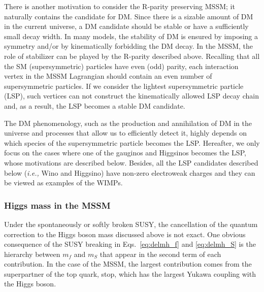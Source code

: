 \documentclass[12pt,twoside,book]{article}
\begin{document}
There is another motivation to consider the R-parity preserving MSSM; it naturally contains the candidate for DM.
Since there is a sizable amount of DM in the current universe, a DM candidate should be stable or have a sufficiently small decay width.
In many models, the stability of DM is ensured by imposing a symmetry and/or by kinematically forbidding the DM decay.
In the MSSM, the role of stabilizer can be played by the R-parity described above.
Recalling that all the SM (supersymmetric) particles have even (odd) parity, each interaction vertex in the MSSM Lagrangian should contain an even number of supersymmetric particles.
If we consider the lightest supersymmetric particle (LSP), such vertices can not construct the kinematically allowed LSP decay chain and, as a result, the LSP becomes a stable DM candidate.

The DM phenomenology, such as the production and annihilation of DM in the universe and processes that allow us to efficiently detect it, highly depends on which species of the supersymmetric particle becomes the LSP.
Hereafter, we only focus on the cases where one of the gauginos and Higgsinos becomes the LSP, whose motivations are described below.
Besides, all the LSP candidates described below (\textit{i.e.,} Wino and Higgsino) have non-zero electroweak charges and they can be viewed as examples of the WIMPs.


\subsubsection*{Higgs mass in the MSSM}

Under the spontaneously or softly broken SUSY, the cancellation of the quantum correction to the Higgs boson mass discussed above is not exact.
One obvious consequence of the SUSY breaking in Eqs.~\eqref{eq:delmh_f} and \eqref{eq:delmh_S} is the hierarchy between $m_f$ and $m_S$ that appear in the second term of each contribution.
In the case of the MSSM, the largest contribution comes from the superpartner of the top quark, stop, which has the largest Yukawa coupling with the Higgs boson.
\end{document}
